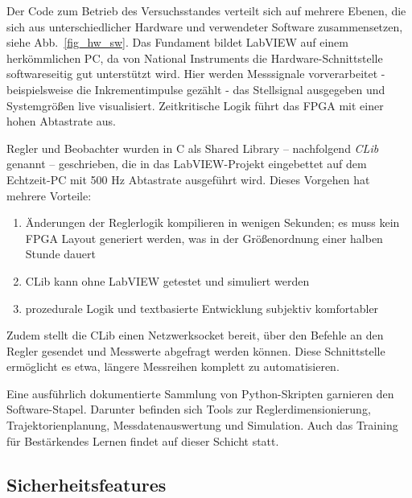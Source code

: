 \documentclass[a4paper,10pt]{scrartcl}
\begin{document}
Der Code zum Betrieb des Versuchsstandes verteilt sich auf mehrere Ebenen, die sich aus unterschiedlicher Hardware und verwendeter Software zusammensetzen, siehe Abb.~\ref{fig_hw_sw}. Das Fundament bildet LabVIEW auf einem herkömmlichen PC, da von National Instruments die Hardware-Schnittstelle softwareseitig gut unterstützt wird. Hier werden Messsignale vorverarbeitet - beispielsweise die Inkrementimpulse gezählt - das Stellsignal ausgegeben und Systemgrößen live visualisiert. Zeitkritische Logik führt das FPGA mit einer hohen Abtastrate aus.

Regler und Beobachter wurden in C als Shared Library -- nachfolgend \emph{CLib} genannt -- geschrieben, die in das LabVIEW-Projekt eingebettet auf dem Echtzeit-PC mit 500 Hz Abtastrate ausgeführt wird. Dieses Vorgehen hat mehrere Vorteile:

\begin{enumerate}
    \item Änderungen der Reglerlogik kompilieren in wenigen Sekunden; es muss kein FPGA Layout generiert werden, was in der Größenordnung einer halben Stunde dauert
    \item CLib kann ohne LabVIEW getestet und simuliert werden
    \item prozedurale Logik und textbasierte Entwicklung subjektiv komfortabler
\end{enumerate}

Zudem stellt die CLib einen Netzwerksocket bereit, über den Befehle an den Regler gesendet und Messwerte abgefragt werden können. Diese Schnittstelle ermöglicht es etwa, längere Messreihen komplett zu automatisieren.

Eine ausführlich dokumentierte Sammlung von Python-Skripten garnieren den Software-Stapel. Darunter befinden sich Tools zur Reglerdimensionierung, Trajektorienplanung, Messdatenauswertung und Simulation. Auch das Training für Bestärkendes Lernen findet auf dieser Schicht statt.


\subsection{Sicherheitsfeatures}
\end{document}
